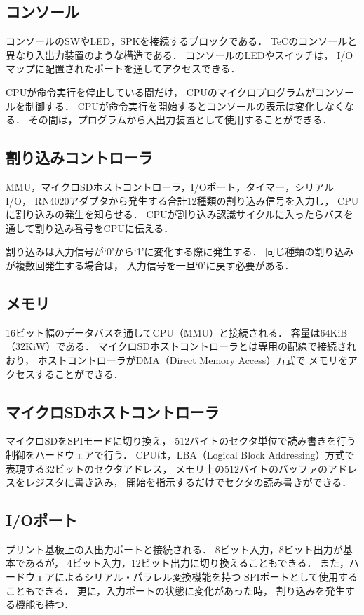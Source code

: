 \subsection{コンソール}
コンソールのSWやLED，SPKを接続するブロックである．
TeCのコンソールと異なり入出力装置のような構造である．
コンソールのLEDやスイッチは，
I/Oマップに配置されたポートを通してアクセスできる．

CPUが命令実行を停止している間だけ，
CPUのマイクロプログラムがコンソールを制御する．
CPUが命令実行を開始するとコンソールの表示は変化しなくなる．
その間は，プログラムから入出力装置として使用することができる．

\subsection{割り込みコントローラ}
MMU，マイクロSDホストコントローラ，I/Oポート，タイマー，シリアルI/O，
RN4020アダプタから発生する合計12種類の割り込み信号を入力し，
CPUに割り込みの発生を知らせる．
CPUが割り込み認識サイクルに入ったらバスを通して割り込み番号をCPUに伝える．

割り込みは入力信号が`0'から`1'に変化する際に発生する．
同じ種類の割り込みが複数回発生する場合は，
入力信号を一旦`0'に戻す必要がある．

\subsection{メモリ}
16ビット幅のデータバスを通してCPU（MMU）と接続される．
容量は64KiB（32KiW）である．
マイクロSDホストコントローラとは専用の配線で接続されおり，
ホストコントローラがDMA（Direct Memory Access）方式で
メモリをアクセスすることができる．

\subsection{マイクロSDホストコントローラ}
マイクロSDをSPIモードに切り換え，
512バイトのセクタ単位で読み書きを行う制御をハードウェアで行う．
CPUは，LBA（Logical Block Addressing）方式で表現する32ビットのセクタアドレス，
メモリ上の512バイトのバッファのアドレスをレジスタに書き込み，
開始を指示するだけでセクタの読み書きができる．

\subsection{I/Oポート}
プリント基板上の入出力ポートと接続される．
8ビット入力，8ビット出力が基本であるが，
4ビット入力，12ビット出力に切り換えることもできる．
また，ハードウェアによるシリアル・パラレル変換機能を持つ
SPIポートとして使用することもできる．
更に，入力ポートの状態に変化があった時，
割り込みを発生する機能も持つ．

